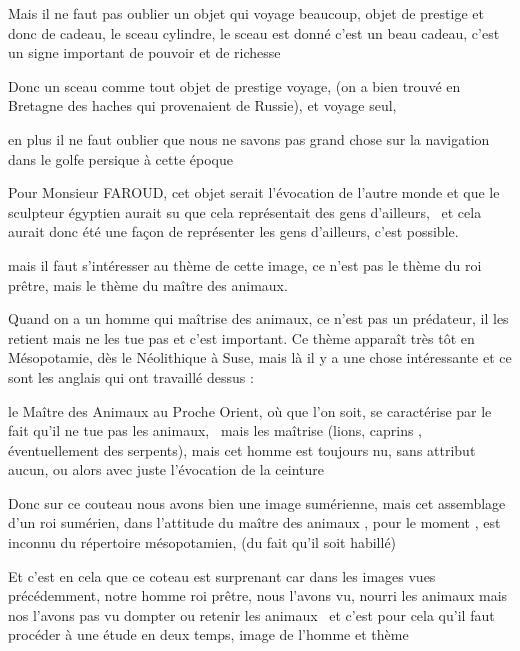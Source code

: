 \documentclass[a4paper]{article}
\begin{document}
\bigskip


\bigskip

{
Mais il ne faut pas oublier un objet qui voyage beaucoup, objet de prestige et donc de cadeau, le sceau cylindre, le
sceau est donné c'est un beau cadeau, c'est un signe important de pouvoir et de richesse}


\bigskip

{
Donc un sceau comme tout objet de prestige voyage, (on a bien trouvé en Bretagne des haches qui provenaient de Russie),
et voyage seul, }

{
en plus il ne faut oublier que nous ne savons pas grand chose sur la navigation dans le golfe persique à cette époque}


\bigskip

{
Pour Monsieur FAROUD, cet objet serait l'évocation de l'autre monde et que le sculpteur égyptien aurait su que cela
représentait des gens d'ailleurs, \ et cela aurait donc été une façon de représenter les gens d'ailleurs, c'est
possible.}


\bigskip


\bigskip

{
mais il faut s'intéresser au thème de cette image, ce n'est pas le thème du roi prêtre, mais le thème du maître des
animaux.}

{
Quand on a un homme qui maîtrise des animaux, ce n'est pas un prédateur, il les retient mais ne les tue pas et c'est
important. Ce thème apparaît très tôt en Mésopotamie, dès le Néolithique à Suse, mais là il y a une chose intéressante
et ce sont les anglais qui ont travaillé dessus : }

{
le Maître des Animaux au Proche Orient, où que l'on soit, se caractérise par le fait qu'il ne tue pas les animaux,
\ mais les maîtrise (lions, caprins , éventuellement des serpents), mais cet homme est toujours nu, sans attribut
aucun, ou alors avec juste l'évocation de la ceinture }


\bigskip

{
Donc sur ce couteau nous avons bien une image sumérienne, mais cet assemblage d'un roi sumérien, dans l'attitude du
maître des animaux , pour le moment , est inconnu du répertoire mésopotamien, (du fait qu'il soit habillé)}

{
Et c'est en cela que ce coteau est surprenant car dans les images vues précédemment, notre homme roi prêtre, nous
l'avons vu, nourri les animaux mais nos l'avons pas vu dompter ou retenir les animaux \ et c'est pour cela qu'il faut
procéder à une étude en deux temps, image de l'homme et thème}
\end{document}

